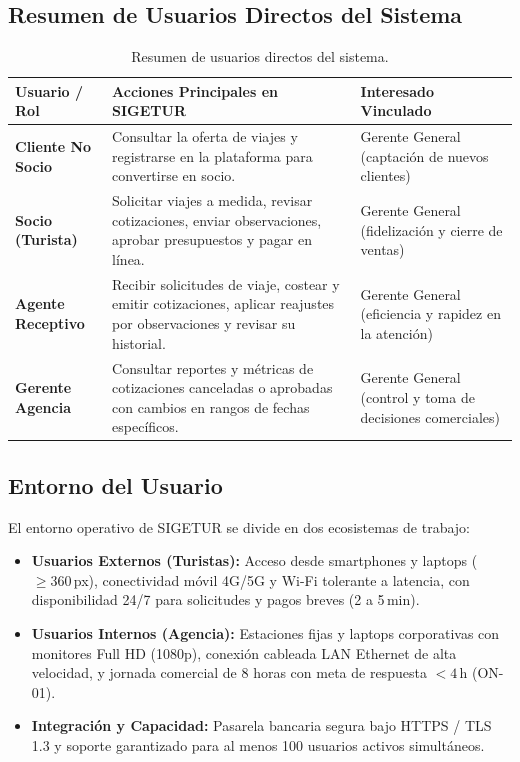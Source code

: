 \subsection{Resumen de Usuarios Directos del Sistema}
\begin{table}[H]
\centering
\footnotesize
\begin{tabularx}{\textwidth}{lLL}
\toprule
\textbf{Usuario / Rol} & \textbf{Acciones Principales en SIGETUR} & \textbf{Interesado Vinculado} \\
\midrule
\textbf{Cliente No Socio} & Consultar la oferta de viajes y registrarse en la plataforma para convertirse en socio. & Gerente General (captación de nuevos clientes) \\
\textbf{Socio (Turista)} & Solicitar viajes a medida, revisar cotizaciones, enviar observaciones, aprobar presupuestos y pagar en línea. & Gerente General (fidelización y cierre de ventas) \\
\textbf{Agente Receptivo} & Recibir solicitudes de viaje, costear y emitir cotizaciones, aplicar reajustes por observaciones y revisar su historial. & Gerente General (eficiencia y rapidez en la atención) \\
\textbf{Gerente Agencia} & Consultar reportes y métricas de cotizaciones canceladas o aprobadas con cambios en rangos de fechas específicos. & Gerente General (control y toma de decisiones comerciales) \\
\bottomrule
\end{tabularx}
\caption{Resumen de usuarios directos del sistema.}\label{tab:usuarios}
\end{table}

\subsection{Entorno del Usuario}
El entorno operativo de SIGETUR se divide en dos ecosistemas de trabajo:
\begin{itemize}[noitemsep]
    \item \textbf{Usuarios Externos (Turistas):} Acceso desde smartphones y laptops ($\ge 360$\,px), conectividad móvil 4G/5G y Wi-Fi tolerante a latencia, con disponibilidad 24/7 para solicitudes y pagos breves (2 a 5\,min).
    \item \textbf{Usuarios Internos (Agencia):} Estaciones fijas y laptops corporativas con monitores Full HD (1080p), conexión cableada LAN Ethernet de alta velocidad, y jornada comercial de 8 horas con meta de respuesta $< 4$\,h (ON-01).
    \item \textbf{Integración y Capacidad:} Pasarela bancaria segura bajo HTTPS / TLS 1.3 y soporte garantizado para al menos 100 usuarios activos simultáneos.
\end{itemize}

